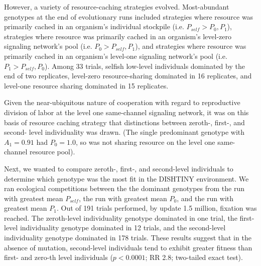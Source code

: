 However, a variety of resource-caching strategies evolved.
Most-abundant genotypes at the end of evolutionary runs included strategies where resource was primarily cached in an organism's individual stockpile (i.e. $P_{self} > P_0, P_1$), strategies where resource was primarily cached in an organism's level-zero signaling network's pool (i.e. $P_0 > P_{self}, P_1$), and strategies where resource was primarily cached in an organism's level-one signaling network's pool (i.e. $P_1 > P_{self}, P_0$).
Among 33 trials, selfish low-level individuals dominated by the end of two replicates, level-zero resource-sharing dominated in 16 replicates, and level-one resource sharing dominated in 15 replicates.

Given the near-ubiquitous nature of cooperation with regard to reproductive division of labor at the level one same-channel signaling network, it was on this basis of resource caching strategy that distinctions between zeroth-, first-, and second- level individuality was drawn.
(The single predominant genotype with $A_1 = 0.91$ had $P_0 = 1.0$, so was not sharing resource on the level one same-channel resource pool).

Next, we wanted to compare zeroth-, first-, and second-level individuals to determine which genotype was the most fit in the DISHTINY environment.
We ran ecological competitions between the the dominant genotypes from the run with greatest mean $P_{self}$, the run with greatest mean $P_0$, and the run with greatest mean $P_1$.
Out of 191 trials performed, by update 1.5 million, fixation was reached.  %
The zeroth-level individuality genotype dominated in one trial, the first-level individuality genotype dominated in 12 trials, and the second-level individuality genotype dominated in 178 trials.
These results suggest that in the absence of mutation, second-level individuals tend to exhibit greater fitness than first- and zero-th level individuals ($p < 0.0001$; RR 2.8; two-tailed exact test).

